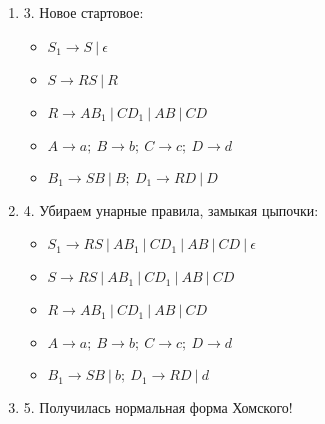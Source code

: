 \documentclass[12pt]{article}
\newenvironment{MyList}[1][4pt]{
  \begin{enumerate}[1.]
  \setlength{\parskip}{0pt}
  \setlength{\itemsep}{#1}
}{       
  \end{enumerate}
}
\begin{document}
\begin{MyList}[8pt]
\begin{MyList}[8pt]
\begin{itemize}
		\end{itemize}
		Убираем $\epsilon$-правила: \\
		\begin{itemize}
			\item $S \to R S \ | \ R \ | \ \epsilon$
			\item $R \to A B_1 \ | \ C D_1 \ | \ A B \ | \ C D$
			\item $A \to a; \ B \to b; \ C \to c; \ D \to d$
			\item $B_1 \to S B \ | \ B; \ D_1 \to R D \ | \ D$
		\end{itemize}
	\item [3.] Новое стартовое: \\
		\begin{itemize}
			\item $S_1 \to S \ | \ \epsilon$
			\item $S \to R S \ | \ R$
			\item $R \to A B_1 \ | \ C D_1 \ | \ A B \ | \ C D$
			\item $A \to a; \ B \to b; \ C \to c; \ D \to d$
			\item $B_1 \to S B \ | \ B; \ D_1 \to R D \ | \ D$
		\end{itemize}
	\item [4.] Убираем унарные правила, замыкая цыпочки: \\
		\begin{itemize}
			\item $S_1 \to R S \ | \ A B_1 \ | \ C D_1 \ | \ A B \ | \ C D \ | \ \epsilon$
			\item $S \to R S \ | \ A B_1 \ | \ C D_1 \ | \ A B \ | \ C D$
			\item $R \to A B_1 \ | \ C D_1 \ | \ A B \ | \ C D$
			\item $A \to a; \ B \to b; \ C \to c; \ D \to d$
			\item $B_1 \to S B \ | \ b; \ D_1 \to R D \ | \ d$
		\end{itemize}
	\item [5.]
	Получилась нормальная форма Хомского!
 		
	\end{MyList} 
 

\end{MyList}
\end{document}
